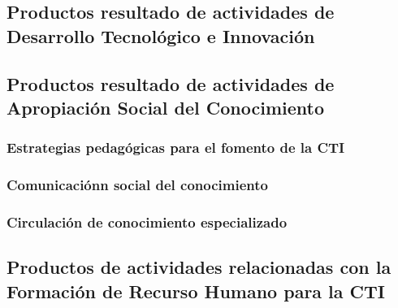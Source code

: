 \documentclass[12pt]{article}
\begin{document}
\subsection{Productos resultado de actividades de Desarrollo
  Tecnol\'ogico e Innovaci\'on} 

\subsection{Productos resultado de actividades de Apropiación Social
  del Conocimiento} 

\subsubsection{Estrategias pedag\'ogicas para el fomento de la CTI}

\subsubsection{Comunicaci\'onn social del conocimiento}

\subsubsection{Circulaci\'on de conocimiento especializado}


\subsection{Productos de actividades relacionadas con la Formación de Recurso
Humano para la CTI }
\end{document}
